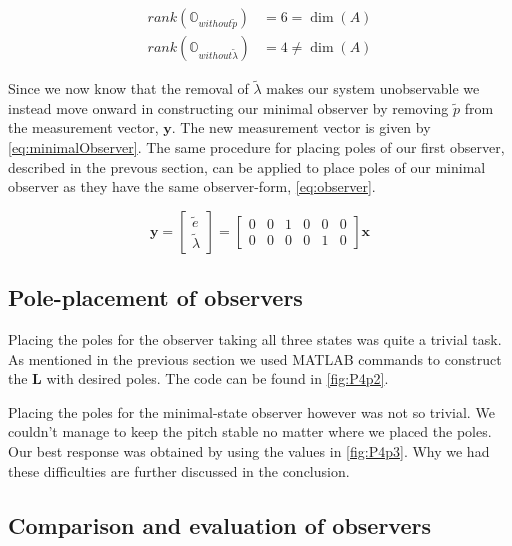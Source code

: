 \begin{subequations}
    \begin{align}
    rank(\mathbb{O}_{without \tilde{p}}) &= 6 = \dim(A) \label{eq:obsNotP}
    \\
    rank(\mathbb{O}_{without \tilde{\lambda}}) &= 4 \neq \dim(A) \label{eq:obsNotLambda}
    \end{align}
\end{subequations}

Since we now know that the removal of $\tilde{\lambda}$ makes our system unobservable we instead move onward in constructing our minimal observer by removing $\tilde{p}$ from the measurement vector, $\mathbf{y}$. The new measurement vector is given by \cref{eq:minimalObserver}.
The same procedure for placing poles of our first observer, described in the prevous section, can be applied to place poles of our minimal observer as they have the same observer-form, \cref{eq:observer}.


\begin{equation}\label{eq:minimalObserver}
    \mathbf{y} = \begin{bmatrix} \tilde{e} \\ \tilde{\lambda} \end{bmatrix} =
    \begin{bmatrix}
        0 & 0 & 1 & 0 & 0 & 0 \\
        0 & 0 & 0 & 0 & 1 & 0
    \end{bmatrix}
    \mathbf{x}
\end{equation}

\subsection{Pole-placement of observers}

Placing the poles for the observer taking all three states was quite a trivial task. As mentioned in the previous section we used MATLAB commands to construct the $\mathbf{L}$ with desired poles. The code can be found in \cref{fig:P4p2}.

Placing the poles for the minimal-state observer however was not so trivial. We couldn't manage to keep the pitch stable no matter where we placed the poles. Our best response was obtained by using the values in \cref{fig:P4p3}. Why we had these difficulties are further discussed in the conclusion.

\subsection{Comparison and evaluation of observers}

